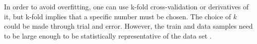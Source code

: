 In order to avoid overfitting, one can use k-fold cross-validation or derivatives of it, but k-fold implies that a specific number must be chosen. The choice of $k$ could be made through trial and error. However, the train and data samples need to be large enough to be statistically representative of the data set \cite{Refaeilzadeh2009}. 